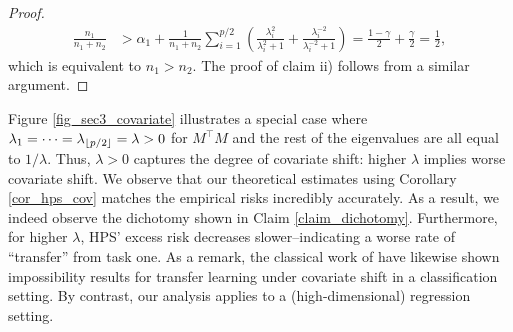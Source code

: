 \begin{proof}
\begin{align*}
     \frac{n_1}{n_1 + n_2} &> \alpha_1 + \frac{1}{n_1+n_2} \sum_{i=1}^{p/2}\left(\frac{\lambda_i^2}{\lambda_i^2+1}+\frac{\lambda_i^{-2}}{\lambda_i^{-2}+1}\right) = \frac{1-\gamma}{2}+\frac{\gamma}{2}=\frac{1}{2},
    \end{align*}
    which is equivalent to $n_1>n_2$. The proof of claim ii) follows from a similar argument. %
\end{proof}

Figure \ref{fig_sec3_covariate} illustrates a special case where $\lambda_1 = \cdots = \lambda_{\lfloor {p /2} \rfloor} = \lambda > 0$ for $M^{\top}M$ and the rest of the eigenvalues are all equal to $1 / \lambda$.
Thus, $\lambda > 0$ captures the degree of covariate shift: higher $\lambda$ implies worse covariate shift.
We observe that our theoretical estimates using Corollary \ref{cor_hps_cov} matches the empirical risks incredibly accurately.
As a result, we indeed observe the dichotomy shown in Claim \ref{claim_dichotomy}.
Furthermore, for higher $\lambda$, HPS' excess risk decreases slower--indicating a worse rate of ``transfer'' from task one. 
As a remark, the classical work of \citet{david2010impossibility} have likewise shown impossibility results for transfer learning under covariate shift in a classification setting.
By contrast, our analysis applies to a (high-dimensional) regression setting.


